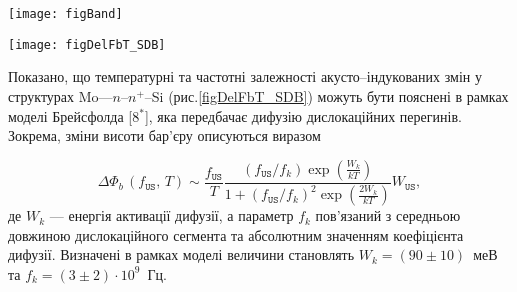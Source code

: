 
\begin{SCfigure}
\texttt{[image: figBand]}
\caption{\label{figBand}
Схематичне зображення
просторового розподілу поверхневого потенціалу,
що відображає різницю між випадком УЗН (верхні поверхня та контурна площина) та
його відсутністю (нижні поверхня та контурна площина).
Рисунок зроблено у припущенні, що наявні два патчі.
При розрахунку використана формула~(1.5.3) з
[5$^*$]
}
\end{SCfigure}


\begin{SCfigure}[1.0][b]
\texttt{[image: figDelFbT\_SDB]}
\caption{\label{figDelFbT_SDB}
Температурні залежності акусто--індукованих змін висоти бар'єру Шотткі структур Mo---$n$--$n^+$--Si.
Точки --- експеримент,
лінії --- апроксимація згідно з формулою~(\ref{eqBr})
}%
\end{SCfigure}

Показано, що температурні та частотні залежності акусто--індукованих змін у структурах
 Mo---$n$--$n^+$--Si (рис.\ref{figDelFbT_SDB}) можуть бути пояснені в рамках моделі Брейсфолда
[8$^*$],
яка передбачає дифузію дислокаційних перегинів.
Зокрема, зміни висоти бар'єру описуються виразом

\begin{equation}
\label{eqBr}
\Delta\Phi_{b}\,(f_\mathtt{US},\,T)\sim\frac{f_\mathtt{US}}{T}\frac{(f_\mathtt{US}/{f_k})\exp\left(\frac{W_k}{kT}\right)}
{1+(f_\mathtt{US}/{f_k})^2\exp\left(\frac{2W_k}{kT}\right)}W_\mathtt{US},
\end{equation}
де
$W_k$ --- енергія активації дифузії,
а параметр $f_k$ пов'язаний з середньою довжиною дислокаційного сегмента та абсолютним значенням коефіцієнта дифузії.
Визначені в рамках моделі величини становлять $W_k=(90\pm10)$~меВ та $f_k=(3\pm2)\cdot10^9$~Гц.


